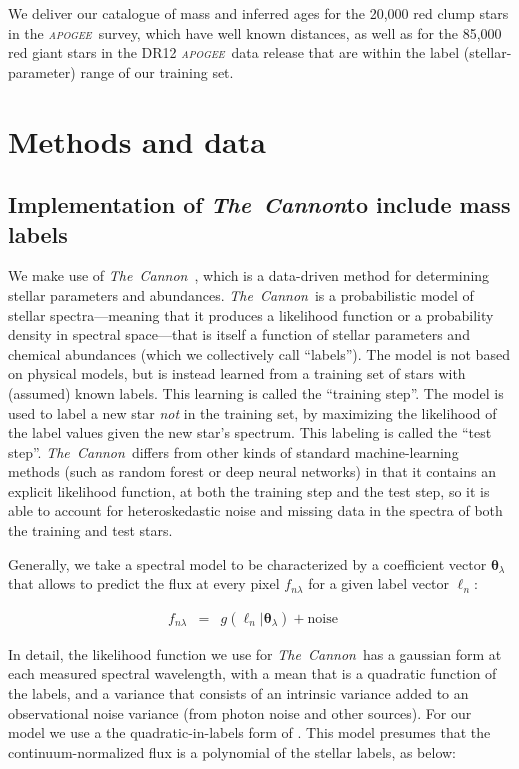 \documentclass[12pt, preprint]{aastex}
\newcommand{\project}[1]{\textsl{#1}}
\newcommand{\tc}{\project{The~Cannon}}
\newcommand{\apogee}{\project{\textsc{apogee}}}
\newcommand{\set}[1]{\bm{#1}}
\newcommand{\starlabel}{\ell}
\newcommand{\starlabelvec}{\set{\starlabel}}
\begin{document}
We deliver our catalogue of mass and inferred ages for the 20,000 red clump stars in the \apogee\ survey, which have well known distances, as well as for the 85,000 red giant stars in the DR12 \apogee\ data release that are within the label (stellar-parameter) range of our training set.



\section{Methods and data}
\label{sec:methods}

\subsection{Implementation of \tc to include mass labels}

We make use of \tc\ \citep{Ness2015}, which is a data-driven method for
determining stellar parameters and abundances.
\tc\ is a probabilistic model of stellar spectra---meaning that it
produces a likelihood function or a probability density in spectral
space---that is itself a function of stellar parameters and chemical
abundances (which we collectively call ``labels'').
The model is not based on physical models, but is instead learned
from a training set of stars with (assumed) known labels.
This learning is called the ``training step''.
The model is used to label a new star \emph{not} in the training set,
by maximizing the likelihood of the label values given the new star's
spectrum.
This labeling is called the ``test step''.
\tc\ differs from other kinds of standard machine-learning methods
(such as random forest or deep neural networks) in that it contains an
explicit likelihood function, at both the training step and the test
step, so it is able to account for heteroskedastic noise and missing
data in the spectra of both the training and test stars.

Generally, we take a spectral model to be characterized by a coefficient vector $\set{\theta}_\lambda$
that allows to predict the flux at every pixel $f_{n\lambda}$ for a given label vector $\starlabelvec_n$:


\begin{eqnarray}
f_{n\lambda} &=&
g(\starlabelvec_n |  \set{\theta}_\lambda) + \mbox{noise}
\label{eq:specmodel}\quad 
\end{eqnarray}

In detail, the likelihood function we use for \tc\ has a
gaussian form at each measured spectral wavelength, with a mean that
is a quadratic function of the labels, and a variance that consists of
an intrinsic variance added to an observational noise variance (from
photon noise and other sources). For our model we use a the quadratic-in-labels form of \citet{Ness2015}. This model presumes that the continuum-normalized flux is a polynomial of the stellar labels, as below: 
\end{document}
